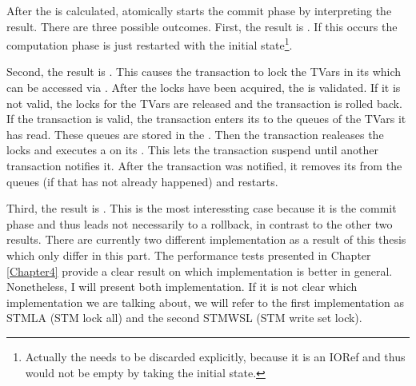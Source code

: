 After the  is calculated, atomically starts the commit phase by interpreting
the result. There are three possible outcomes.
First, the result is . If this occurs the computation phase is just restarted 
with the initial state\footnote{Actually the  needs to be discarded explicitly,
because it is an IORef and thus would not be empty by taking the initial state.}. 

Second, the result is . This causes the transaction to lock the TVars in its 
 which can be accessed via . After the locks have been acquired, 
the  is validated. If it is not valid, the locks for the TVars are released and
the transaction is rolled back. If the transaction is 
valid, the transaction enters its  to the queues of the TVars it has read.
These queues are stored in the . Then the transaction realeases the locks and 
executes a  on its . This lets the transaction suspend until
another transaction notifies it. After the transaction was notified, it removes its 
 from the queues (if that has not already happened) and restarts.

Third, the result is . This is the most interessting case
because it is the commit phase and thus leads not necessarily to a rollback, in contrast to 
the other two results. 
There are currently two different implementation as a result of this thesis which 
only differ in this part. The performance tests presented in Chapter \ref{Chapter4} 
provide a clear result on which implementation is better in general. Nonetheless, I will present
both implementation. If it is not clear which implementation we are talking about,
we will refer to the first implementation as STMLA (STM lock all) and the second STMWSL 
(STM write set lock). 

